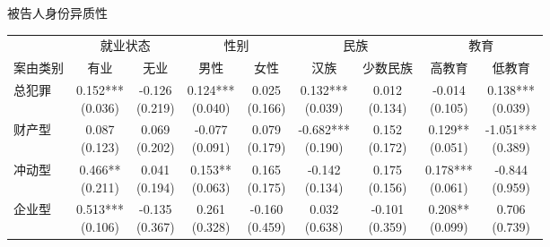 \documentclass[aspectratio=169,10pt]{ctexbeamer}
\begin{document}
\begin{frame}[plain]{被告人身份异质性}
  \centering
  \tiny
  \begin{adjustbox}{width=\textwidth}
  \begin{tabular}{lcccccccc}
    \toprule
     & \multicolumn{2}{c}{就业状态} & \multicolumn{2}{c}{性别} & \multicolumn{2}{c}{民族} & \multicolumn{2}{c}{教育} \\
    \cmidrule(lr){2-3}\cmidrule(lr){4-5}\cmidrule(lr){6-7}\cmidrule(lr){8-9}
    案由类别 & 有业 & 无业 & 男性 & 女性 & 汉族 & 少数民族 & 高教育 & 低教育 \\
    \midrule
    总犯罪 & \makecell{0.152***\\(0.036)} & \makecell{-0.126\\(0.219)} & \makecell{0.124***\\(0.040)} & \makecell{0.025\\(0.166)} & \makecell{0.132***\\(0.039)} & \makecell{0.012\\(0.134)} & \makecell{-0.014\\(0.105)} & \makecell{0.138***\\(0.039)} \\
    财产型 & \makecell{0.087\\(0.123)} & \makecell{0.069\\(0.202)} & \makecell{-0.077\\(0.091)} & \makecell{0.079\\(0.179)} & \makecell{-0.682***\\(0.190)} & \makecell{0.152\\(0.172)} & \makecell{0.129**\\(0.051)} & \makecell{-1.051***\\(0.389)} \\
    冲动型 & \makecell{0.466**\\(0.211)} & \makecell{0.041\\(0.194)} & \makecell{0.153**\\(0.063)} & \makecell{0.165\\(0.175)} & \makecell{-0.142\\(0.134)} & \makecell{0.175\\(0.156)} & \makecell{0.178***\\(0.061)} & \makecell{-0.844\\(0.959)} \\
    企业型 & \makecell{0.513***\\(0.106)} & \makecell{-0.135\\(0.367)} & \makecell{0.261\\(0.328)} & \makecell{-0.160\\(0.459)} & \makecell{0.032\\(0.638)} & \makecell{-0.101\\(0.359)} & \makecell{0.208**\\(0.099)} & \makecell{0.706\\(0.739)} \\

\end{tabular}
\end{adjustbox}
\end{frame}
\end{document}
